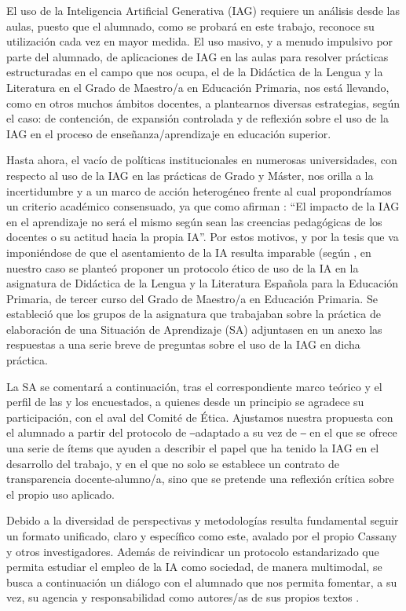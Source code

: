 \documentclass[spanish]{textolivre}
\begin{document}
El uso de la Inteligencia Artificial Generativa (IAG) requiere un análisis desde las aulas, puesto que el alumnado, como se probará en este trabajo, reconoce su utilización cada vez en mayor medida. El uso masivo, y a menudo impulsivo por parte del alumnado, de aplicaciones de IAG en las aulas para resolver prácticas estructuradas en el campo que nos ocupa, el de la Didáctica de la Lengua y la Literatura en el Grado de Maestro/a en Educación Primaria, nos está llevando, como en otros muchos ámbitos docentes, a plantearnos diversas estrategias, según el caso: de contención, de expansión controlada y de reflexión sobre el uso de la IAG en el proceso de enseñanza/aprendizaje en educación superior.

Hasta ahora, el vacío de políticas institucionales en numerosas universidades, con respecto al uso de la IAG en las prácticas de Grado y Máster, nos orilla a la incertidumbre y a un marco de acción heterogéneo frente al cual propondríamos un criterio académico consensuado, ya que como afirman \textcite[p. 26]{MagroLara2025}: “El impacto de la IAG en el aprendizaje no será el mismo según sean las creencias pedagógicas de los docentes o su actitud hacia la propia IA”. Por estos motivos, y por la tesis que va imponiéndose de que el asentamiento de la IA resulta imparable (según \textcite{GarciaPenalvo2023,CuestaGarciaGonzalezArguelloPujola2024}, en nuestro caso se planteó proponer un protocolo ético de uso de la IA en la asignatura de Didáctica de la Lengua y la Literatura Española para la Educación Primaria, de tercer curso del Grado de Maestro/a en Educación Primaria. Se estableció que los grupos de la asignatura que trabajaban sobre la práctica de elaboración de una Situación de Aprendizaje (SA) adjuntasen en un anexo las respuestas a una serie breve de preguntas sobre el uso de la IAG en dicha práctica.

La SA se comentará a continuación, tras el correspondiente marco teórico y el perfil de las y los encuestados, a quienes desde un principio se agradece su participación, con el aval del Comité de Ética. Ajustamos nuestra propuesta con el alumnado a partir del protocolo de \textcite{Cassany2024} ‒adaptado a su vez de \textcite{FranganilloLopezosaSalse2023,CodinaGarde2023}‒ en el que se ofrece una serie de ítems que ayuden a describir el papel que ha tenido la IAG en el desarrollo del trabajo, y en el que no solo se establece un contrato de transparencia docente-alumno/a, sino que se pretende una reflexión crítica sobre el propio uso aplicado.

Debido a la diversidad de perspectivas y metodologías resulta fundamental seguir un formato unificado, claro y específico como este, avalado por el propio Cassany y otros investigadores. Además de reivindicar un protocolo estandarizado que permita estudiar el empleo de la IA como sociedad, de manera multimodal, se busca a continuación un diálogo con el alumnado que nos permita fomentar, a su vez, su agencia y responsabilidad como autores/as de sus propios textos \cite{Cassany2024}.
\end{document}
